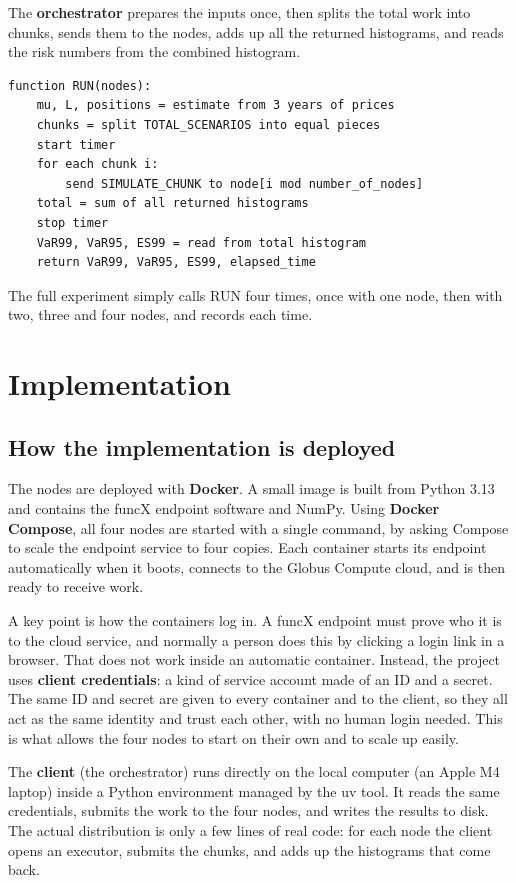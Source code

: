 \documentclass[11pt,a4paper]{article}
\begin{document}
The \textbf{orchestrator} prepares the inputs once, then splits the total work into chunks, sends them to the nodes, adds up all the returned histograms, and reads the risk numbers from the combined histogram.

\begin{lstlisting}[style=plain]
function RUN(nodes):
    mu, L, positions = estimate from 3 years of prices
    chunks = split TOTAL_SCENARIOS into equal pieces
    start timer
    for each chunk i:
        send SIMULATE_CHUNK to node[i mod number_of_nodes]
    total = sum of all returned histograms
    stop timer
    VaR99, VaR95, ES99 = read from total histogram
    return VaR99, VaR95, ES99, elapsed_time
\end{lstlisting}

The full experiment simply calls RUN four times, once with one node, then with two, three and four nodes, and records each time.

\section{Implementation}

\subsection{How the implementation is deployed}

The nodes are deployed with \textbf{Docker}. A small image is built from Python 3.13 and contains the funcX endpoint software and NumPy. Using \textbf{Docker Compose}, all four nodes are started with a single command, by asking Compose to scale the endpoint service to four copies. Each container starts its endpoint automatically when it boots, connects to the Globus Compute cloud, and is then ready to receive work.

A key point is how the containers log in. A funcX endpoint must prove who it is to the cloud service, and normally a person does this by clicking a login link in a browser. That does not work inside an automatic container. Instead, the project uses \textbf{client credentials}: a kind of service account made of an ID and a secret. The same ID and secret are given to every container and to the client, so they all act as the same identity and trust each other, with no human login needed. This is what allows the four nodes to start on their own and to scale up easily.

The \textbf{client} (the orchestrator) runs directly on the local computer (an Apple M4 laptop) inside a Python environment managed by the uv tool. It reads the same credentials, submits the work to the four nodes, and writes the results to disk. The actual distribution is only a few lines of real code: for each node the client opens an executor, submits the chunks, and adds up the histograms that come back.
\end{document}
